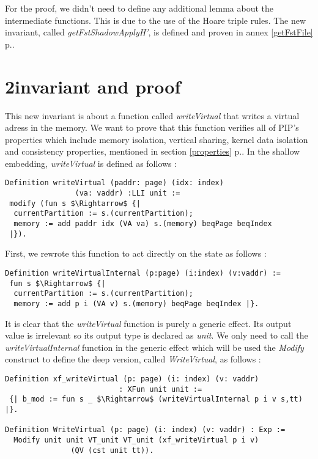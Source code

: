 For the proof, we didn't need to define any additional lemma about the intermediate functions. This is due to the use of the Hoare triple rules. The new invariant, called \textit{getFstShadowApplyH'}, is defined and proven in annex \ref{getFstFile} p.\pageref{getFstFile}.

\section{2\nd invariant and proof} \label{writeInvSec}
This new invariant is about a function called \textit{writeVirtual} that writes a virtual adress in the memory. We want to prove that this function verifies all of PIP's properties which include memory isolation, vertical sharing, kernel data isolation and consistency properties, mentioned in section \ref{properties} p.\pageref{properties}. In the shallow embedding, \textit{writeVirtual} is defined as follows : 
\begin{lstlisting}[caption = {writeVirtual function in the shallow embedding}, xleftmargin=-.05\textwidth,
xrightmargin=-.05\textwidth,mathescape=true, label={writeS}]
Definition writeVirtual (paddr: page) (idx: index) 
		        (va: vaddr) :LLI unit :=
 modify (fun s $\Rightarrow$ {| 
  currentPartition := s.(currentPartition);
  memory := add paddr idx (VA va) s.(memory) beqPage beqIndex 
 |}).
\end{lstlisting} \vspace{4pt}
First, we rewrote this function to act directly on the state as follows :
\begin{lstlisting}[caption = {Rewritten shallow writeVirtual function}, xleftmargin=-.06\textwidth,
xrightmargin=-.06\textwidth,mathescape=true]
Definition writeVirtualInternal (p:page) (i:index) (v:vaddr) :=
 fun s $\Rightarrow$ {| 
  currentPartition := s.(currentPartition);
  memory := add p i (VA v) s.(memory) beqPage beqIndex |}.  
\end{lstlisting} \vspace{4pt}
It is clear that the \textit{writeVirtual} function is purely a generic effect. Its output value is irrelevant so its output type is declared as \textit{unit}. We only need to call the \textit{writeVirtualInternal} function in the generic effect which will be used the \textit{Modify} construct to define the deep version, called \textit{WriteVirtual}, as follows : 
\begin{lstlisting}[caption = {WriteVirtual definition}, xleftmargin=-.07\textwidth,
xrightmargin=-.07\textwidth,mathescape=true, label={writeD}]
Definition xf_writeVirtual (p: page) (i: index) (v: vaddr) 
	                      : XFun unit unit := 
 {| b_mod := fun s _ $\Rightarrow$ (writeVirtualInternal p i v s,tt) |}.

Definition WriteVirtual (p: page) (i: index) (v: vaddr) : Exp :=
  Modify unit unit VT_unit VT_unit (xf_writeVirtual p i v) 
  	           (QV (cst unit tt)).    
\end{lstlisting} \vspace{4pt}

